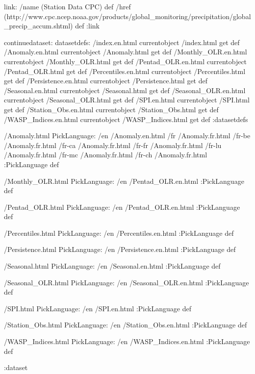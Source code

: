 \begin{ingrid}
link:
/name (Station Data CPC) def
/href (http://www.cpc.ncep.noaa.gov/products/global_monitoring/precipitation/global_precip_accum.shtml) def
:link

continuedataset:
datasetdefs:
/index.en.html currentobject /index.html get def
/Anomaly.en.html currentobject /Anomaly.html get def
/Monthly_OLR.en.html currentobject /Monthly_OLR.html get def
/Pentad_OLR.en.html currentobject /Pentad_OLR.html get def
/Percentiles.en.html currentobject /Percentiles.html get def
/Persistence.en.html currentobject /Persistence.html get def
/Seasonal.en.html currentobject /Seasonal.html get def
/Seasonal_OLR.en.html currentobject /Seasonal_OLR.html get def
/SPI.en.html currentobject /SPI.html get def
/Station_Obs.en.html currentobject /Station_Obs.html get def
/WASP_Indices.en.html currentobject /WASP_Indices.html get def
:datasetdefs

/Anomaly.html {
PickLanguage:
/en /Anomaly.en.html
/fr /Anomaly.fr.html
/fr-be /Anomaly.fr.html
/fr-ca /Anomaly.fr.html
/fr-fr /Anomaly.fr.html
/fr-lu /Anomaly.fr.html
/fr-mc /Anomaly.fr.html
/fr-ch /Anomaly.fr.html
:PickLanguage
} def

/Monthly_OLR.html{
PickLanguage:
/en /Pentad_OLR.en.html
:PickLanguage
} def

/Pentad_OLR.html{
PickLanguage:
/en /Pentad_OLR.en.html
:PickLanguage
} def

/Percentiles.html{
PickLanguage:
/en /Percentiles.en.html
:PickLanguage
} def

/Persistence.html{
PickLanguage:
/en /Persistence.en.html
:PickLanguage
} def


/Seasonal.html{
PickLanguage:
/en /Seasonal.en.html
:PickLanguage
} def


/Seasonal_OLR.html{
PickLanguage:
/en /Seasonal_OLR.en.html
:PickLanguage
} def


/SPI.html{
PickLanguage:
/en /SPI.en.html
:PickLanguage
} def


/Station_Obs.html{
PickLanguage:
/en /Station_Obs.en.html
:PickLanguage
} def


/WASP_Indices.html{
PickLanguage:
/en /WASP_Indices.en.html
:PickLanguage
} def

:dataset
\end{ingrid}
